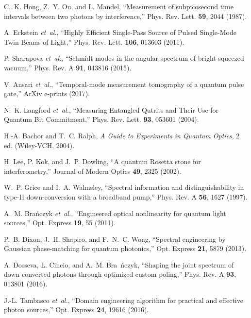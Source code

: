 \documentclass[12pt]{article}
\begin{document}
\begin{thebibliography}{10}

C.~K. Hong, Z.~Y. Ou, and L. Mandel, ``Measurement of subpicosecond time
  intervals between two photons by interference,'' Phys. Rev. Lett. {\bf 59},
  2044 (1987).

A. Eckstein {\it et~al.}, ``Highly Efficient Single-Pass Source of Pulsed
  Single-Mode Twin Beams of Light,'' Phys. Rev. Lett. {\bf 106}, 013603 (2011).

P. Sharapova {\it et~al.}, ``Schmidt modes in the angular spectrum of bright
  squeezed vacuum,'' Phys. Rev. A {\bf 91}, 043816 (2015).

V. {Ansari} {\it et~al.}, ``{Temporal-mode measurement tomography of a quantum
  pulse gate},'' ArXiv e-prints  (2017).

N.~K. Langford {\it et~al.}, ``Measuring Entangled Qutrits and Their Use for
  Quantum Bit Commitment,'' Phys. Rev. Lett. {\bf 93}, 053601 (2004).

H.-A. Bachor and T.~C. Ralph, {\it A Guide to Experiments in Quantum Optics}, 2
  ed. (Wiley-VCH, 2004).

H. Lee, P. Kok, and J.~P. Dowling, ``A quantum Rosetta stone for
  interferometry,'' Journal of Modern Optics {\bf 49}, 2325 (2002).

W.~P. Grice and I.~A. Walmsley, ``Spectral information and distinguishability
  in type-II down-conversion with a broadband pump,'' Phys. Rev. A {\bf 56},
  1627 (1997).

A.~M. Bra\'{n}czyk {\it et~al.}, ``Engineered optical nonlinearity for quantum
  light sources,'' Opt. Express {\bf 19}, 55 (2011).

P.~B. Dixon, J.~H. Shapiro, and F.~N.~C. Wong, ``Spectral engineering by
  Gaussian phase-matching for quantum photonics,'' Opt. Express {\bf 21}, 5879
  (2013).

A. Dosseva, L. Cincio, and A.~M. Bra\ifmmode~\else \'{n}\fi{}czyk,
  ``Shaping the joint spectrum of down-converted photons through optimized
  custom poling,'' Phys. Rev. A {\bf 93}, 013801 (2016).

J.-L. Tambasco {\it et~al.}, ``Domain engineering algorithm for practical and
  effective photon sources,'' Opt. Express {\bf 24}, 19616 (2016).


\end{thebibliography}
\end{document}
